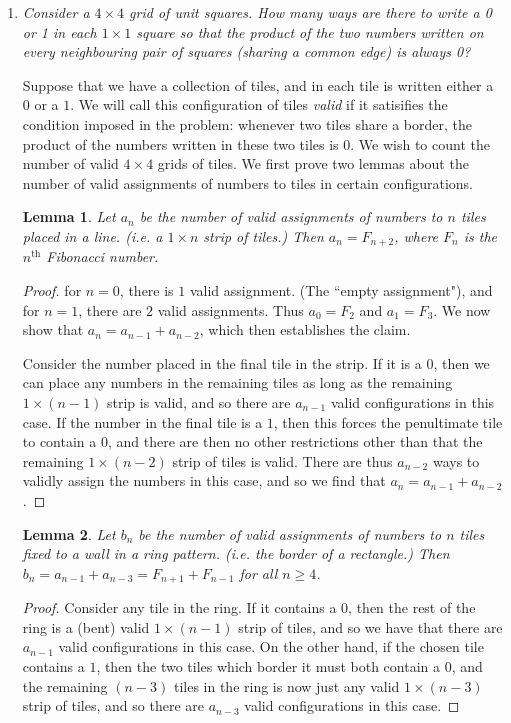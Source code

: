 \documentclass[a4paper,12pt]{article}
\newtheorem{lemma}{Lemma}
\begin{document}
\begin{enumerate}
	\item
	\textit{Consider a $4 \times 4$ grid of unit squares. How many ways are there to write a 0 or 1 in each $1 \times 1$ square so that the product of the two numbers written on every neighbouring pair of squares (sharing a common edge) is always 0?}
	
	Suppose that we have a collection of tiles, and in each tile is written
	either a $0$ or a $1$. We will call this configuration of tiles
	\emph{valid} if it satisifies the condition imposed in the problem:
	whenever two tiles share a border, the product of the numbers written
	in these two tiles is $0$. We wish to count the number of valid $4 \times
	4$ grids of tiles. We first prove two lemmas about the number of valid
	assignments of numbers to tiles in certain configurations.

	\begin{lemma} \label{lemma:strip}
		Let $a_n$ be the number of valid assignments of numbers to $n$ tiles
		placed in a line. (i.e. a $1 \times n$ strip of tiles.) Then $a_n =
		F_{n+2}$, where $F_n$ is the $n^\text{th}$ Fibonacci number.
	\end{lemma}
	\begin{proof}
		for $n=0$, there is $1$ valid assignment. (The ``empty
		assignment"), and for $n=1$, there are $2$ valid assignments. Thus
		$a_0=F_2$ and $a_1=F_3$. We now show that $a_{n} = a_{n-1} + a_{n-2}$,
		which then establishes the claim.

		Consider the number placed in the final tile in the strip. If it is a
		$0$, then we can place any numbers in the remaining tiles as long as
		the remaining $1 \times (n-1)$ strip is valid, and so there are
		$a_{n-1}$ valid configurations in this case. If the number in the final
		tile is a $1$,
		then this forces the penultimate tile to contain a $0$, and there
		are then no other restrictions other than that the remaining $1 \times
		(n-2)$ strip of tiles is valid. There are thus $a_{n-2}$ ways to validly
		assign the numbers in this case, and so we find that $a_n = a_{n-1} +
		a_{n-2}$.
	\end{proof}

	\begin{lemma} \label{lemma:ring}
		Let $b_n$ be the number of valid assignments of numbers to $n$ tiles
		fixed to a wall in a ring pattern. (i.e. the border of a rectangle.) Then
		$b_n = a_{n-1} + a_{n-3} = F_{n+1} + F_{n-1}$ for all $n \geq 4$.
	\end{lemma}
	\begin{proof}
		Consider any tile in the ring. If it contains a $0$, then the rest of
		the ring is a (bent) valid $1 \times (n-1)$ strip of tiles, and so we
		have that there are $a_{n-1}$ valid configurations in this case. On the
		other hand, if the chosen tile contains a $1$, then the two tiles
		which border it must both contain a $0$, and the remaining $(n-3)$
		tiles in the ring is now just any valid $1 \times (n-3)$ strip of
		tiles, and so there are $a_{n-3}$ valid configurations in this case.
	 

\end{proof}
\end{enumerate}
\end{document}
